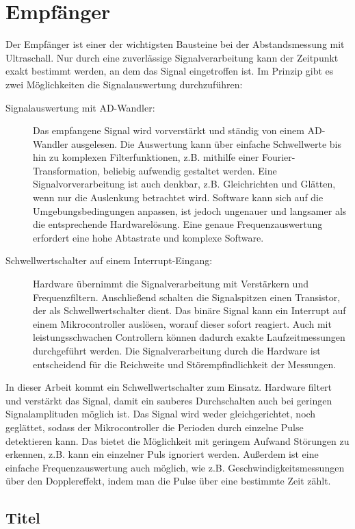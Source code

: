 \section{Empfänger}
Der Empfänger ist einer der wichtigsten Bausteine bei der Abstandsmessung mit Ultraschall. Nur durch eine zuverlässige Signalverarbeitung kann der Zeitpunkt exakt bestimmt werden, an dem das Signal eingetroffen ist. Im Prinzip gibt es zwei Möglichkeiten die Signalauswertung durchzuführen:
\begin{description} %
	\item[Signalauswertung mit AD-Wandler:] Das empfangene Signal wird vorverstärkt und ständig von einem AD-Wandler ausgelesen. Die Auswertung kann über einfache Schwellwerte bis hin zu komplexen Filterfunktionen, z.B. mithilfe einer Fourier-Transformation, beliebig aufwendig gestaltet werden. Eine Signalvorverarbeitung ist auch denkbar, z.B. Gleichrichten und Glätten, wenn nur die Auslenkung betrachtet wird. Software kann sich auf die Umgebungsbedingungen anpassen, ist jedoch ungenauer und langsamer als die entsprechende Hardwarelösung. Eine genaue Frequenzauswertung erfordert eine hohe Abtastrate und komplexe Software.
	\item[Schwellwertschalter auf einem Interrupt-Eingang:] Hardware übernimmt die Signalverarbeitung mit Verstärkern und Frequenzfiltern. Anschließend schalten die Signalspitzen einen Transistor, der als Schwellwertschalter dient. Das binäre Signal kann ein Interrupt auf einem Mikrocontroller auslösen, worauf dieser sofort reagiert. Auch mit leistungsschwachen Controllern können dadurch exakte Laufzeitmessungen durchgeführt werden. Die Signalverarbeitung durch die Hardware ist entscheidend für die Reichweite und Störempfindlichkeit der Messungen.
\end{description}

In dieser Arbeit kommt ein Schwellwertschalter zum Einsatz. Hardware filtert und verstärkt das Signal, damit ein sauberes Durchschalten auch bei geringen Signalamplituden möglich ist. Das Signal wird weder gleichgerichtet, noch geglättet, sodass der Mikrocontroller die Perioden durch einzelne Pulse detektieren kann. Das bietet die Möglichkeit mit geringem Aufwand Störungen zu erkennen, z.B. kann ein einzelner Puls ignoriert werden. Außerdem ist eine einfache Frequenzauswertung auch möglich, wie z.B. Geschwindigkeitsmessungen über den Dopplereffekt, indem man die Pulse über eine bestimmte Zeit zählt.\\


\subsection{Titel}



